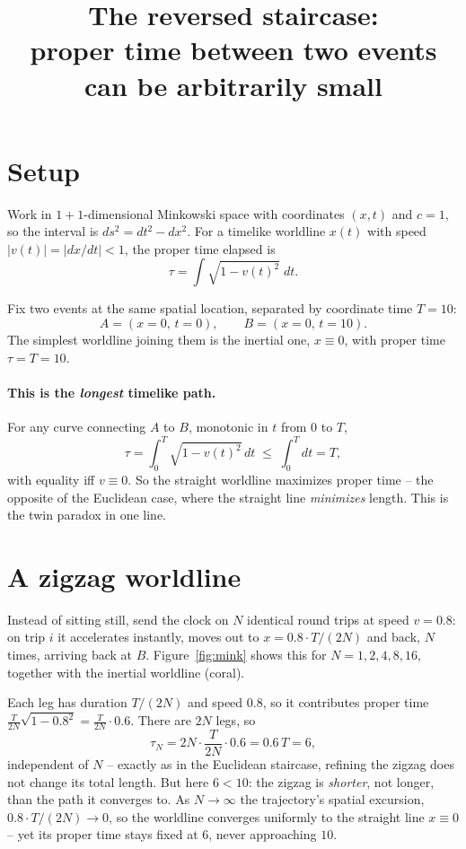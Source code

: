 \documentclass[11pt]{article}
\title{The reversed staircase:\\ proper time between two events can be arbitrarily small}
\author{}
\date{}
\begin{document}
\maketitle

\section{Setup}

Work in $1{+}1$-dimensional Minkowski space with coordinates $(x,t)$ and
$c=1$, so the interval is $ds^2 = dt^2 - dx^2$. For a timelike worldline
$x(t)$ with speed $|v(t)|=|dx/dt|<1$, the proper time elapsed is
$$\tau = \int \sqrt{1-v(t)^2}\;dt .$$

Fix two events at the same spatial location, separated by coordinate time
$T=10$:
$$A=(x{=}0,\,t{=}0), \qquad B=(x{=}0,\,t{=}10).$$
The simplest worldline joining them is the inertial one, $x\equiv 0$, with
proper time $\tau=T=10$.

\paragraph{This is the \emph{longest} timelike path.} For any curve
connecting $A$ to $B$, monotonic in $t$ from $0$ to $T$,
$$\tau=\int_0^T \sqrt{1-v(t)^2}\,dt \;\le\; \int_0^T dt = T,$$
with equality iff $v\equiv 0$. So the straight worldline maximizes proper
time -- the opposite of the Euclidean case, where the straight line
\emph{minimizes} length. This is the twin paradox in one line.

\section{A zigzag worldline}

Instead of sitting still, send the clock on $N$ identical round trips at
speed $v=0.8$: on trip $i$ it accelerates instantly, moves out to
$x=0.8\cdot T/(2N)$ and back, $N$ times, arriving back at $B$. Figure~\ref{fig:mink}
shows this for $N=1,2,4,8,16$, together with the inertial worldline (coral).

Each leg has duration $T/(2N)$ and speed $0.8$, so it contributes proper time
$\tfrac{T}{2N}\sqrt{1-0.8^2} = \tfrac{T}{2N}\cdot 0.6$. There are $2N$ legs, so
$$\tau_N = 2N\cdot\frac{T}{2N}\cdot 0.6 = 0.6\,T = 6,$$
independent of $N$ -- exactly as in the Euclidean staircase, refining the
zigzag does not change its total length. But here $6<10$: the zigzag is
\emph{shorter}, not longer, than the path it converges to. As $N\to\infty$
the trajectory's spatial excursion, $0.8\cdot T/(2N)\to 0$, so the worldline
converges uniformly to the straight line $x\equiv0$ -- yet its proper time
stays fixed at $6$, never approaching $10$.
\end{document}
